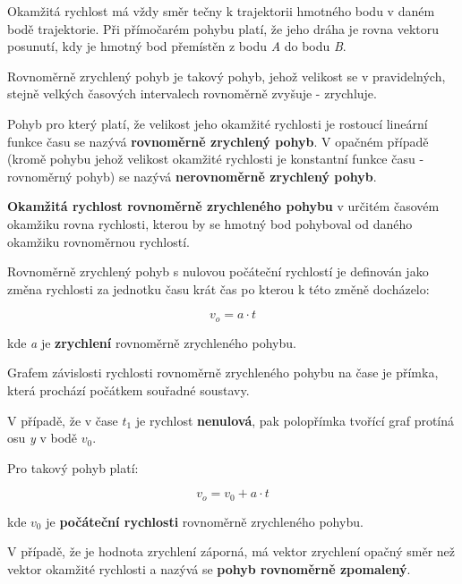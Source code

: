 \vskip 4mm
\centerline{}
\vskip 4mm


Okamžitá rychlost má vždy směr tečny k trajektorii hmotného bodu v daném bodě trajektorie. Při přímočarém pohybu platí, že jeho dráha je rovna vektoru posunutí, kdy je hmotný bod přemístěn z bodu {\it A} do bodu {\it B}.

\vskip 4mm
\centerline{}
\vskip 4mm


Rovnoměrně zrychlený pohyb je takový pohyb, jehož velikost se v pravidelných, stejně velkých časových intervalech rovnoměrně zvyšuje - zrychluje. 

Pohyb pro který platí, že velikost jeho okamžité rychlosti je rostoucí lineární funkce času se nazývá {\bf rovnoměrně zrychlený pohyb}. V opačném případě (kromě pohybu jehož velikost okamžité rychlosti je konstantní funkce času - rovnoměrný pohyb) se nazývá {\bf nerovnoměrně zrychlený pohyb}.

{\bf Okamžitá rychlost rovnoměrně zrychleného pohybu} v určitém časovém okamžiku rovna rychlosti, kterou by se hmotný bod pohyboval od daného okamžiku rovnoměrnou rychlostí.

Rovnoměrně zrychlený pohyb s nulovou počáteční rychlostí je definován jako změna rychlosti za jednotku času krát čas po kterou k této změně docházelo:

$$ v_o = a\cdot t $$

kde {\it a} je {\bf zrychlení} rovnoměrně zrychleného pohybu.

Grafem závislosti rychlosti rovnoměrně zrychleného pohybu na čase je přímka, která prochází počátkem souřadné soustavy.

\vskip 4mm
\centerline{}
\vskip 4mm


V případě, že v čase $t_1$ je rychlost {\bf nenulová}, pak polopřímka tvořící graf protíná osu {\it y} v bodě $v_0$.

\vskip 4mm
\centerline{}
\vskip 4mm

Pro takový pohyb platí:

$$ v_o = v_0 + a \cdot t $$

kde $v_0$ je {\bf počáteční rychlosti} rovnoměrně zrychleného pohybu.


V případě, že je hodnota zrychlení záporná, má vektor zrychlení opačný směr než vektor okamžité rychlosti a nazývá se {\bf pohyb rovnoměrně zpomalený}. 

\vskip 4mm
\centerline{}
\vskip 4mm


